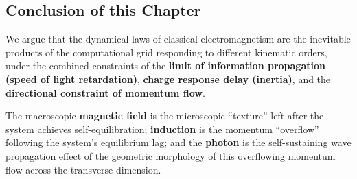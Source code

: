 \documentclass[12pt, a4paper]{article}
\begin{document}
\subsection{Conclusion of this Chapter}

We argue that the dynamical laws of classical electromagnetism are the inevitable products of the computational grid responding to different kinematic orders, under the combined constraints of the \textbf{limit of information propagation (speed of light retardation)}, \textbf{charge response delay (inertia)}, and the \textbf{directional constraint of momentum flow}.

The macroscopic \textbf{magnetic field} is the microscopic ``texture'' left after the system achieves self-equilibration; \textbf{induction} is the momentum ``overflow'' following the system's equilibrium lag; and the \textbf{photon} is the self-sustaining wave propagation effect of the geometric morphology of this overflowing momentum flow across the transverse dimension.
\end{document}
